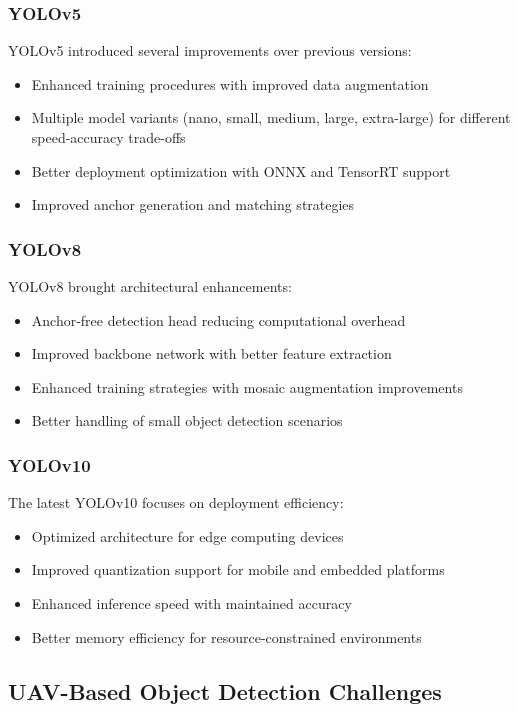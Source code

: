 \documentclass[12pt,a4paper]{article}
\begin{document}
\subsubsection{YOLOv5}
YOLOv5 introduced several improvements over previous versions:
\begin{itemize}
    \item Enhanced training procedures with improved data augmentation
    \item Multiple model variants (nano, small, medium, large, extra-large) for different speed-accuracy trade-offs
    \item Better deployment optimization with ONNX and TensorRT support
    \item Improved anchor generation and matching strategies
\end{itemize}

\subsubsection{YOLOv8}
YOLOv8 brought architectural enhancements:
\begin{itemize}
    \item Anchor-free detection head reducing computational overhead
    \item Improved backbone network with better feature extraction
    \item Enhanced training strategies with mosaic augmentation improvements
    \item Better handling of small object detection scenarios
\end{itemize}

\subsubsection{YOLOv10}
The latest YOLOv10 focuses on deployment efficiency:
\begin{itemize}
    \item Optimized architecture for edge computing devices
    \item Improved quantization support for mobile and embedded platforms
    \item Enhanced inference speed with maintained accuracy
    \item Better memory efficiency for resource-constrained environments
\end{itemize}

\subsection{UAV-Based Object Detection Challenges}
\end{document}
